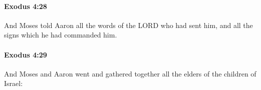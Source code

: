 		\paragraph{Exodus 4:28} %
			\label{EXODUS-4-28}

			And Moses told Aaron all the words of the LORD who had sent him, and all the signs which he had commanded him.


		\paragraph{Exodus 4:29} %
			\label{EXODUS-4-29}

			And Moses and Aaron went and gathered together all the elders of the children of Israel:


